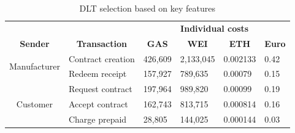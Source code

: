 \documentclass[conference]{IEEEtran}
\begin{document}
\begin{table}[!htbp]
\centering
\caption{DLT selection based on key features}
\begin{tabular}{clllll}
\textbf{}                     & \multicolumn{1}{c}{\textbf{}}            & \multicolumn{4}{c}{\textbf{Individual costs}}                                                                                              \\
\textbf{Sender}               & \multicolumn{1}{c}{\textbf{Transaction}} & \multicolumn{1}{c}{\textbf{GAS}} & \multicolumn{1}{c}{\textbf{WEI}} & \multicolumn{1}{c}{\textbf{ETH}} & \multicolumn{1}{c}{\textbf{Euro}} \\
\multirow{2}{*}{Manufacturer} & Contract creation                        & 426,609                          & 2,133,045                        & 0.002133                         & 0.42                              \\
                              & Redeem receipt                           & 157,927                          & 789,635                          & 0.00079                          & 0.15                              \\
\multirow{3}{*}{Customer}     & Request contract                         & 197,964                          & 989,820                          & 0.00099                          & 0.19                              \\
                              & Accept contract                          & 162,743                          & 813,715                          & 0.000814                         & 0.16                              \\
                              & Charge prepaid                           & 28,805                           & 144,025                          & 0.000144                         & 0.03                             
\end{tabular}
\end{table}
\end{document}
